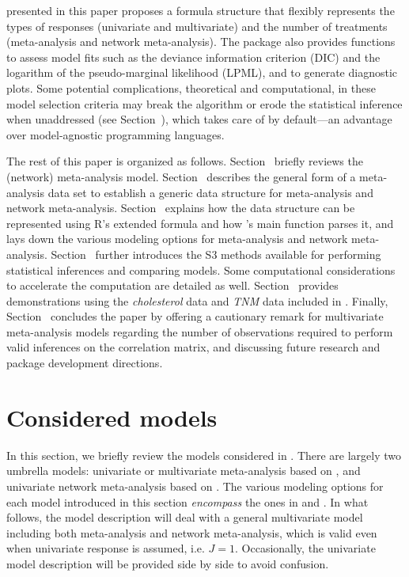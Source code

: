  presented in this paper proposes a formula structure that flexibly represents the types of responses (univariate and multivariate) and the number of treatments (meta-analysis and network meta-analysis). The package also provides functions to assess model fits such as the deviance information criterion (DIC) and the logarithm of the pseudo-marginal likelihood (LPML), and to generate diagnostic plots. Some potential complications, theoretical and computational, in these model selection criteria may break the algorithm or erode the statistical inference when unaddressed (see Section~), which  takes care of by default---an advantage over model-agnostic programming languages.

The rest of this paper is organized as follows. {\color{black}Section~ briefly reviews the (network) meta-analysis model. Section~ describes the general form of a meta-analysis data set to establish a generic data structure for meta-analysis and network meta-analysis. Section~ explains how the data structure can be represented using R's extended formula and how 's main function parses it, and lays down the various modeling options for meta-analysis and network meta-analysis.} Section~ further introduces the S3 methods available for performing statistical inferences and comparing models. Some computational considerations to accelerate the computation are detailed as well. Section~ provides demonstrations using the \emph{cholesterol} data and \emph{TNM} data included in . Finally, Section~ concludes the paper by offering a cautionary remark for multivariate meta-analysis models regarding the number of observations required to perform valid inferences on the correlation matrix, and discussing future research and package development directions.

\section{Considered models}\label{sec:considered-models}
In this section, we briefly review the models considered in . There are largely two umbrella models: univariate or multivariate meta-analysis based on \cite{yao2015bayesian}, and univariate network meta-analysis based on \cite{li2021bayesian}. The various modeling options for each model introduced in this section \emph{encompass} the ones in \cite{yao2015bayesian} and \cite{li2021bayesian}. In what follows, the model description will deal with a general multivariate model including both meta-analysis and network meta-analysis, which is valid even when univariate response is assumed, i.e. $J=1$. Occasionally, the univariate model description will be provided side by side to avoid confusion.

